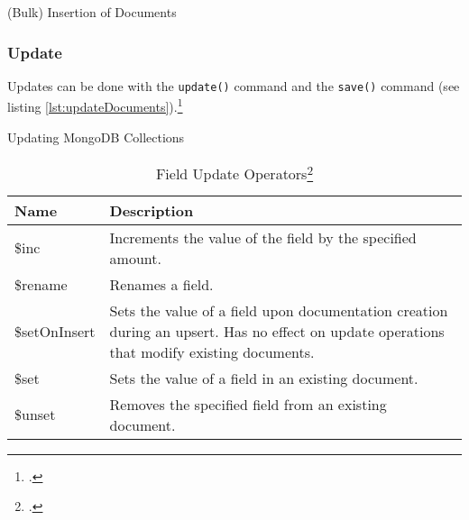 \begin{code}
    \caption{(Bulk) Insertion of Documents}
    \label{lst:insertDocuments}
\end{code}

\FloatBarrier
\pagebreak

\subsubsection{Update}
Updates can be done with the \texttt{update()} command and the \texttt{save()}
command (see listing \ref{lst:updateDocuments}).\footcite[Cf.][p. 75 et. sqq.]{mongo_crud_manual}

\begin{code}
	\caption{Updating MongoDB Collections}
	\label{lst:updateDocuments}
\end{code}

\begin{savenotes}
\begin{table}[htbp]
\begin{tabular*}{\textwidth}{p{} p{}}
\toprule
	\textbf{Name} 					& \textbf{Description}\\
	\midrule 
	\$inc			& Increments the value of the field by the specified amount.\\
	\$rename		& Renames a field.\\
	\$setOnInsert	& Sets the value of a field upon documentation creation during an upsert. Has no effect on update operations that modify existing documents.\\
	\$set			& Sets the value of a field in an existing document.\\
	\$unset			& Removes the specified field from an existing document.\\
\bottomrule 
\end{tabular*}
  \caption[]{Field Update Operators\footcite[][]{mongo_update}}
  \label{tab:query-selectors-compare}
\end{table}
\end{savenotes}

